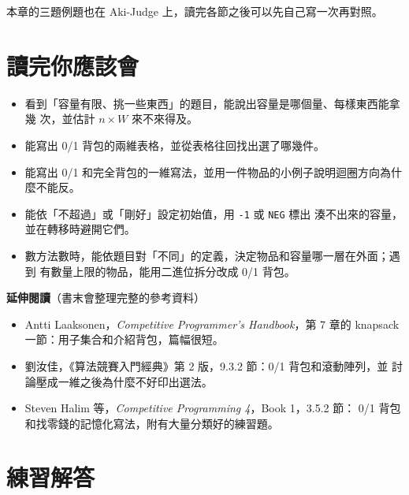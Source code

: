 本章的三題例題也在 Aki-Judge 上，讀完各節之後可以先自己寫一次再對照。

\section{讀完你應該會}
\label{sec:knap-checklist}

\begin{itemize}
\item 看到「容量有限、挑一些東西」的題目，能說出容量是哪個量、每樣東西能拿幾
次，並估計 $n \times W$ 來不來得及。
\item 能寫出 0/1 背包的兩維表格，並從表格往回找出選了哪幾件。
\item 能寫出 0/1 和完全背包的一維寫法，並用一件物品的小例子說明迴圈方向為什
麼不能反。
\item 能依「不超過」或「剛好」設定初始值，用 \texttt{-1} 或 \texttt{NEG} 標出
湊不出來的容量，並在轉移時避開它們。
\item 數方法數時，能依題目對「不同」的定義，決定物品和容量哪一層在外面；遇到
有數量上限的物品，能用二進位拆分改成 0/1 背包。
\end{itemize}

\textbf{延伸閱讀}（書末會整理完整的參考資料）

\begin{itemize}
\item Antti Laaksonen，\textit{Competitive Programmer's Handbook}，第 7 章的
knapsack 一節：用子集合和介紹背包，篇幅很短。
\item 劉汝佳，《算法競賽入門經典》第 2 版，9.3.2 節：0/1 背包和滾動陣列，並
討論壓成一維之後為什麼不好印出選法。
\item Steven Halim 等，\textit{Competitive Programming 4}，Book 1，3.5.2 節：
0/1 背包和找零錢的記憶化寫法，附有大量分類好的練習題。
\end{itemize}

\section*{練習解答}

